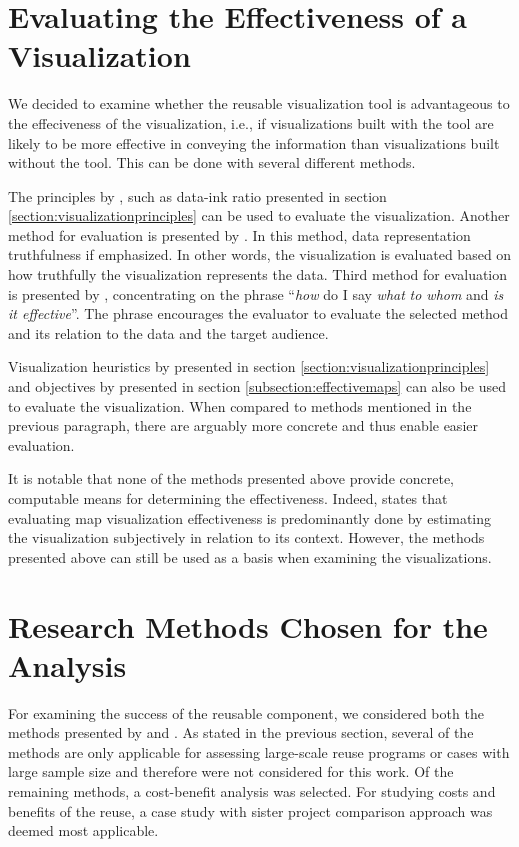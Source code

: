 \section{Evaluating the Effectiveness of a Visualization}

We decided to examine whether the reusable visualization tool is advantageous to the effeciveness of the visualization, i.e., if visualizations built with the tool are likely to be more effective in conveying the information than visualizations built without the tool. This can be done with several different methods. 

The principles by \citet{tufte_visual_1986}, such as data-ink ratio presented in section \ref{section:visualizationprinciples} can be used to evaluate the visualization. Another method for evaluation is presented by \citet{azzam_j-b_2013}. In this method, data representation truthfulness if emphasized. In other words, the visualization is evaluated based on how truthfully the visualization represents the data. Third method for evaluation is presented by \citet{kraak_cartographic_1998}, concentrating on the phrase ``\emph{how} do I say \emph{what} \emph{to whom} and \emph{is it effective}''. The phrase encourages the evaluator to evaluate the selected method and its relation to the data and the target audience.

Visualization heuristics by \citet{zuk_heuristics_2006} presented in section \ref{section:visualizationprinciples} and objectives by \citet{schlichtmann_visualization_2002} presented in section \ref{subsection:effectivemaps} can also be used to evaluate the visualization. When compared to methods mentioned in the previous paragraph, there are arguably more concrete and thus enable easier evaluation.

It is notable that none of the methods presented above provide concrete, computable means for determining the effectiveness. Indeed, \citet{kraak_cartographic_1998} states that evaluating map visualization effectiveness is predominantly done by estimating the visualization subjectively in relation to its context. However, the methods presented above can still be used as a basis when examining the visualizations.

\section{Research Methods Chosen for the Analysis}

For examining the success of the reusable component, we considered both the methods presented by \citet{frakes_software_1996} and \citet{mohagheghi_quality_2007}. As stated in the previous section, several of the methods are only applicable for assessing large-scale reuse programs or cases with large sample size and therefore were not considered for this work. Of the remaining methods, a cost-benefit analysis was selected. For studying costs and benefits of the reuse, a case study with sister project comparison approach was deemed most applicable. 

